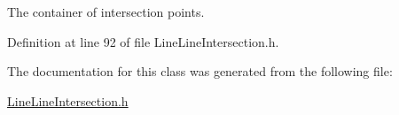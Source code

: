 The container of intersection points. 



Definition at line 92 of file Line\+Line\+Intersection.\+h.



The documentation for this class was generated from the following file\+:\begin{DoxyCompactItemize}
\item 
\hyperlink{_line_line_intersection_8h}{Line\+Line\+Intersection.\+h}\end{DoxyCompactItemize}
